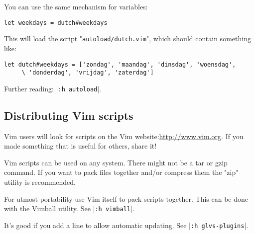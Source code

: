 You can use the same mechanism for variables:

\begin{Verbatim}[samepage=true]
 let weekdays = dutch#weekdays
\end{Verbatim}

This will load the script "\verb!autoload/dutch.vim!", which should contain something like:

\begin{Verbatim}[samepage=true]
 let dutch#weekdays = ['zondag', 'maandag', 'dinsdag', 'woensdag',
     \ 'donderdag', 'vrijdag', 'zaterdag']
\end{Verbatim}

Further reading: |\verb!:h autoload!|.
\subsection{Distributing Vim scripts}
\label{distribute-script}
Vim users will look for scripts on the Vim website:\url{http://www.vim.org}.
If you made something that is useful for others, share it!

Vim scripts can be used on any system.
There might not be a tar or gzip command.
If you want to pack files together and/or compress them the "zip" utility is recommended.

For utmost portability use Vim itself to pack scripts together.
This can be done with the Vimball utility.
See |\verb!:h vimball!|.

It's good if you add a line to allow automatic updating.
See |\verb!:h glvs-plugins!|.
\clearpage
